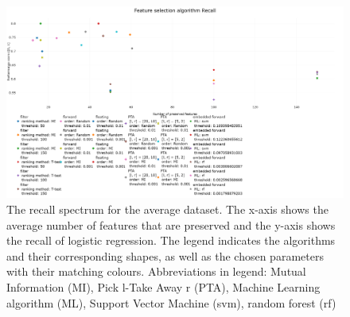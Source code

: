 \begin{figure}[H]
	\centering
	\includegraphics[angle=90,height=1.4\textwidth]{Recall_new.png}
	\caption{The recall spectrum for the average dataset. The x-axis shows the average number of features that are preserved and the y-axis shows the recall of logistic regression. The legend indicates the algorithms and their corresponding shapes, as well as the chosen parameters with their matching colours. Abbreviations in legend: Mutual Information (MI), Pick l-Take Away r (PTA), Machine Learning algorithm (ML), Support Vector Machine (svm), random forest (rf)}
	\label{fig:Avg_Recall_Spectrum}
\end{figure}

